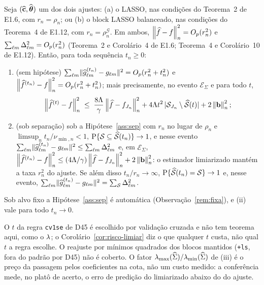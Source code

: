 \documentclass[11pt,a4paper]{article}
\newcommand{\lmin}{\lambda_{\min}}
\newcommand{\bb}{\mathbf{b}}
\newcommand{\ghat}[2]{\widehat{g}_{#1#2}}
\newcommand{\Shat}{\widehat{\mathcal{S}}}
\newcommand{\sepminn}{\nu_{\min,n}}
\newcommand{\rn}{\rho}
\newcommand{\lmaxx}{\lambda_{\max}}
\newcommand{\rhoG}{\rho^{\mathcal{G}}_{n}}
\newcommand{\ESig}{\mathcal{E}_{\Sigma}}
\newcommand{\Dbl}{\Delta_{\cv\md}}
\begin{document}
\begin{corollary}\label{cor:risco-limiar}
Seja $(\widehat{\mathbf{c}},\widehat{\boldsymbol{\theta}})$ um dos dois ajustes: (a) o LASSO, nas condições do
Teorema~2 de E1.6, com $r_{n} = \rn_{n}$; ou (b) o block LASSO balanceado,
nas condições do Teorema~4 de E1.12, com $r_{n} = \rhoG$. Em ambos,
$\left\lVert \widehat f - f \right\rVert_{n}^{2} = O_{p}(r_{n}^{2})$ e $\sum_{\cv\md}\Dbl^{2} =
O_{p}(r_{n}^{2})$ (Teorema~2 e Corolário~4 de E1.6; Teorema~4 e
Corolário~10 de E1.12). Então, para toda sequência $t_{n} \ge 0$:
\begin{enumerate}[label=\textup{(\roman*)}, leftmargin=*]
  \item \textup{(sem hipótese)} $\sum_{\cv\md}\lVert\ghat{\cv}{\md}^{(t_{n})}
    - \gcomp{\cv}{\md}\rVert^{2} = O_{p}(r_{n}^{2} + t_{n}^{2})$ e
    $\left\lVert \widehat f^{(t_{n})} - f \right\rVert_{n}^{2} = O_{p}(r_{n}^{2} + t_{n}^{2})$; mais
    precisamente, no evento $\ESig$ e para todo $t$,
    \[
      \normn{\widehat f^{(t)} - f}^{2}
      \;\le\; \frac{8\Lambda}{\gamma}\normn{\widehat f - f_{J_{n}}}^{2}
      + 4\Lambda t^{2}\,|\mathcal{S}_{J_{n}}\setminus\Shat(t)| + 2\normn{\bb}^{2};
    \]
  \item \textup{(sob separação)} sob a Hipótese~\ref{ass:sep} com $r_{n}$ no
    lugar de $\rn_{n}$ e $\limsup_{n}t_{n}/\sepminn < 1$,
    $\Prob\{\mathcal{S} \subseteq \Shat(t_{n})\} \to 1$, e nesse evento
    $\sum_{\cv\md}\lVert\ghat{\cv}{\md}^{(t_{n})} - \gcomp{\cv}{\md}\rVert^{2}
    \le \sum_{\cv\md}\Dbl^{2}$ e, em $\ESig$,
    $\normn{\widehat f^{(t_{n})} - f}^{2} \le
    (4\Lambda/\gamma)\normn{\widehat f - f_{J_{n}}}^{2} + 2\normn{\bb}^{2}$: o
    estimador limiarizado mantém a taxa $r_{n}^{2}$ do ajuste. Se além disso
    $t_{n}/r_{n} \to \infty$, $\Prob\{\Shat(t_{n}) = \mathcal{S}\} \to 1$ e,
    nesse evento, $\sum_{\cv\md}\lVert\ghat{\cv}{\md}^{(t_{n})} -
    \gcomp{\cv}{\md}\rVert^{2} = \sum_{\mathcal{S}}\Dbl^{2}$.
\end{enumerate}
Sob alvo fixo a Hipótese~\ref{ass:sep} é automática
(Observação~\ref{rem:fixa}), e (ii) vale para todo $t_{n} \to 0$.
\end{corollary}

\begin{remark}\label{rem:adendo-nao}
O $t$ da regra \texttt{cv1se} de D45 é escolhido por validação cruzada e não
tem teorema aqui, como o $\lambda$; o
Corolário~\ref{cor:risco-limiar} diz o que qualquer $t$ custa, não qual $t$ a
regra escolhe. O reajuste por mínimos quadrados dos blocos mantidos
(\texttt{+ls}, fora do padrão por D45) não é coberto. O fator
$\lmaxx(\Gramhat)/\lmin(\Gramhat)$ de (iii) é o preço da passagem pelos
coeficientes na cota, não um custo medido: a conferência mede, no platô de
acerto, o erro de predição do limiarizado abaixo do do ajuste.
\end{remark}
\end{document}
